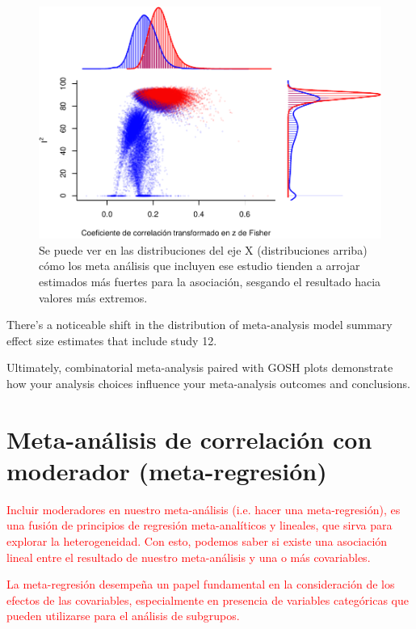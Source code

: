 \documentclass[
  bookmarksnumbered]{article}
\begin{document}
\begin{figure}
\centering
\includegraphics{Meta-analysis_files/figure-latex/unnamed-chunk-33-1.pdf}
\caption{\label{fig:unnamed-chunk-33}Se puede ver en las distribuciones del eje X (distribuciones arriba) cómo los meta análisis que incluyen ese estudio tienden a arrojar estimados más fuertes para la asociación, sesgando el resultado hacia valores más extremos.}
\end{figure}

There's a noticeable shift in the distribution of meta-analysis model summary effect size estimates that include study 12.

Ultimately, combinatorial meta-analysis paired with GOSH plots demonstrate how your analysis choices influence your meta-analysis outcomes and conclusions.

\hypertarget{met-moderation}{%
\section{Meta-análisis de correlación con moderador (meta-regresión)}\label{met-moderation}}

\textcolor{red}{Incluir moderadores en nuestro meta-análisis (i.e. hacer una meta-regresión), es una fusión de principios de regresión meta-analíticos y lineales, que sirva para explorar la heterogeneidad. Con esto, podemos saber si existe una asociación lineal entre el resultado de nuestro meta-análisis y una o más covariables.}

\textcolor{red}{La meta-regresión desempeña un papel fundamental en la consideración de los efectos de las covariables, especialmente en presencia de variables categóricas que pueden utilizarse para el análisis de subgrupos.}
\end{document}
